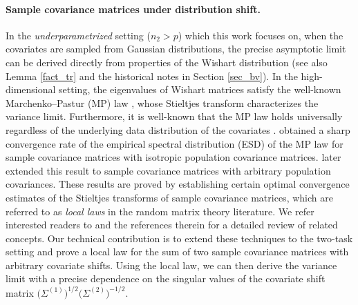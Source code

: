 \paragraph{Sample covariance matrices under distribution shift.}
In the \textit{underparametrized} setting ($n_2 > p$) which this work focuses on, when the covariates are sampled from Gaussian distributions, the precise asymptotic limit can be derived directly from properties of the Wishart distribution (see also Lemma \ref{fact_tr} and the historical notes in Section \ref{sec_bv}).
In the high-dimensional setting, the eigenvalues of Wishart matrices satisfy the well-known Marchenko–Pastur (MP) law \cite{MP}, whose Stieltjes transform characterizes the variance limit.
Furthermore, it is well-known that the MP law holds universally regardless of the underlying data distribution of the covariates \cite{bai2010spectral}. \citet{isotropic} obtained a sharp convergence rate of the empirical spectral distribution (ESD) of the MP law for sample covariance matrices with isotropic population covariance matrices. \citet{Anisotropic,DY} later extended this result to sample covariance matrices with arbitrary population covariances. These results are proved by establishing certain optimal convergence estimates of the Stieltjes transforms of sample covariance matrices, which are referred to as \emph{local laws} in the random matrix theory literature. We refer interested readers to \citet{erdos2017dynamical} and the references therein for a detailed review of related concepts.
Our technical contribution is to extend these techniques to the two-task setting and prove a local law for the sum of two sample covariance matrices with arbitrary covariate shifts.
Using the local law, we can then derive the variance limit with a precise dependence on the singular values of the covariate shift matrix $\big(\Sigma^{(1)}\big)^{1/2} \big(\Sigma^{(2)}\big)^{-1/2}$. 




